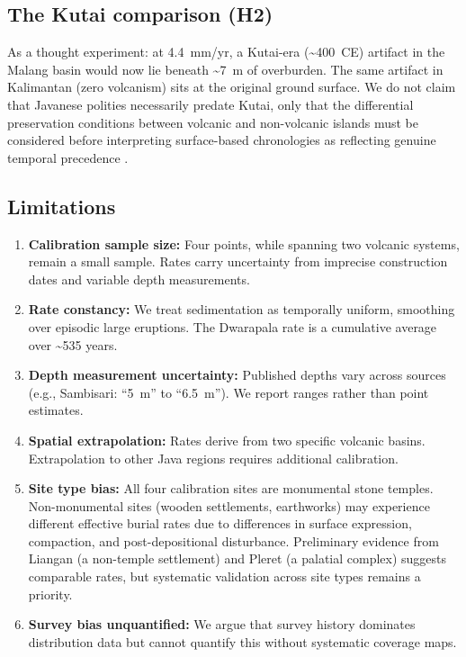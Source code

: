 \documentclass[12pt,a4paper]{article}
\begin{document}
\subsection{The Kutai comparison (H2)}

As a thought experiment: at 4.4~mm/yr, a Kutai-era (\textasciitilde400~CE) artifact in the Malang basin would now lie beneath \textasciitilde7~m of overburden. The same artifact in Kalimantan (zero volcanism) sits at the original ground surface. We do not claim that Javanese polities necessarily predate Kutai, only that the differential preservation conditions between volcanic and non-volcanic islands must be considered before interpreting surface-based chronologies as reflecting genuine temporal precedence \citep{coedes1968}.

\subsection{Limitations}

\begin{enumerate}
  \item \textbf{Calibration sample size:} Four points, while spanning two volcanic systems, remain a small sample. Rates carry uncertainty from imprecise construction dates and variable depth measurements.
  \item \textbf{Rate constancy:} We treat sedimentation as temporally uniform, smoothing over episodic large eruptions. The Dwarapala rate is a cumulative average over \textasciitilde535 years.
  \item \textbf{Depth measurement uncertainty:} Published depths vary across sources (e.g., Sambisari: ``5~m'' to ``6.5~m''). We report ranges rather than point estimates.
  \item \textbf{Spatial extrapolation:} Rates derive from two specific volcanic basins. Extrapolation to other Java regions requires additional calibration.
  \item \textbf{Site type bias:} All four calibration sites are monumental stone temples. Non-monumental sites (wooden settlements, earthworks) may experience different effective burial rates due to differences in surface expression, compaction, and post-depositional disturbance. Preliminary evidence from Liangan (a non-temple settlement) and Pleret (a palatial complex) suggests comparable rates, but systematic validation across site types remains a priority.
  \item \textbf{Survey bias unquantified:} We argue that survey history dominates distribution data but cannot quantify this without systematic coverage maps.
\end{enumerate}
\end{document}
